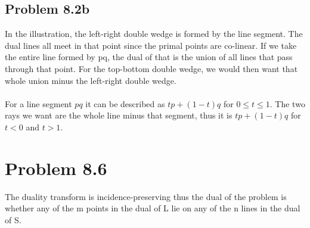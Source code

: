 \documentclass[11pt,psfig]{article}
\begin{document}
\subsection*{Problem 8.2b}

In the illustration, the left-right double wedge is formed by the line segment. The dual lines all meet in that point since the primal points are co-linear. If we take the entire line formed by pq, the dual of that is the union of all lines that pass through that point. For the top-bottom double wedge, we would then want that whole union minus the left-right double wedge. \\
\\
For a line segment $pq$ it can be described as ${tp + (1-t)q}$ for $0 \leq t \leq 1$. The two rays we want are the whole line minus that segment, thus it is ${tp + (1-t)q}$ for $t < 0$ and $t > 1$. 

\section*{Problem 8.6}

The duality transform is incidence-preserving thus the dual of the problem is whether any of the m points in the dual of L lie on any of the n lines in the dual of S. 
\end{document}
